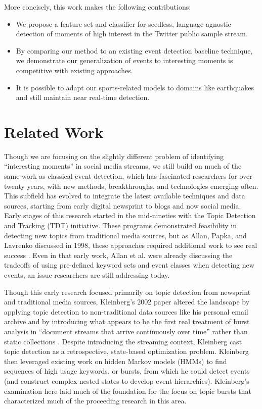 \documentclass{sig-alternate}
\begin{document}
More concisely, this work makes the following contributions:
%
\begin{itemize}
\item We propose a feature set and classifier for seedless, language-agnostic detection of moments of high interest in the Twitter public sample stream.
\item By comparing our method to an existing event detection baseline technique, we demonstrate our generalization of events to interesting moments is competitive with existing approaches.
\item It is possible to adapt our sports-related models to domains like earthquakes and still maintain near real-time detection.
\end{itemize}

\section{Related Work}
\label{sect:relatedWork}

Though we are focusing on the slightly different problem of identifying ``interesting moments'' in social media streams, we still build on much of the same work as classical event detection, which has fascinated researchers for over twenty years, with new methods, breakthroughs, and technologies emerging often.
This subfield has evolved to integrate the latest available techniques and data sources, starting from early digital newsprint to blogs and now social media.
Early stages of this research started in the mid-nineties with the Topic Detection and Tracking (TDT) initiative.
These programs demonstrated feasibility in detecting new topics from traditional media sources, but as Allan, Papka, and Lavrenko discussed in 1998, these approaches required additional work to see real success \cite{allan1998line}.
Even in that early work, Allan et al. were already discussing the tradeoffs of using pre-defined keyword sets and event classes when detecting new events, an issue researchers are still addressing today.

Though this early research focused primarily on topic detection from newsprint and traditional media sources, Kleinberg's 2002 paper altered the landscape by applying topic detection to non-traditional data sources like his personal email archive and by introducing what appears to be the first real treatment of burst analysis in ``document streams that arrive continuously over time'' rather than  static collections \cite{Kleinberg:2002:BHS:775047.775061}. 
Despite introducing the streaming context, Kleinberg cast topic detection as a retrospective, state-based optimization problem.
Kleinberg then leveraged existing work on hidden Markov models (HMMs) to find sequences of high usage keywords, or bursts, from which he could detect events (and construct complex nested states to develop event hierarchies).
Kleinberg's examination here laid much of the foundation for the focus on topic bursts that characterized much of the proceeding research in this area.
\end{document}
